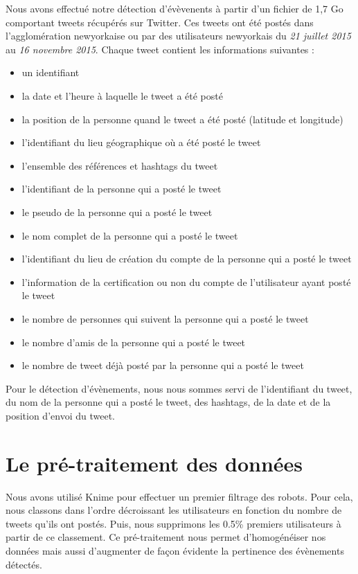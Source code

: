 \documentclass[12pt]{article}
\begin{document}
Nous avons effectu\'e notre d\'etection d'\'ev\`evenents \`a partir d'un fichier de 1,7 Go comportant  tweets  r\'ecup\'er\'es sur Twitter. Ces tweets ont \'et\'e post\'es dans l'agglom\'eration newyorkaise ou par des utilisateurs newyorkais du \textit{21 juillet 2015} au \textit{16 novembre 2015}. Chaque tweet contient les informations suivantes :

\begin{itemize}
	\item un identifiant
	\item la date et l'heure \`a laquelle le tweet a \'et\'e post\'e
	\item la position de la personne quand le tweet a \'et\'e post\'e (latitude et longitude)
	\item l'identifiant du lieu g\'eographique o\`u a \'et\'e post\'e le tweet
	\item l'ensemble des r\'ef\'erences et hashtags du tweet
	\item l'identifiant de la personne qui a post\'e le tweet
	\item le pseudo de la personne qui a post\'e le tweet
	\item le nom complet de la personne qui a post\'e le tweet
	\item l'identifiant du lieu de cr\'eation du compte de la personne qui a post\'e le tweet
	\item l'information de la certification ou non du compte de l'utilisateur ayant post\'e le tweet
	\item le nombre de personnes qui suivent la personne qui a post\'e le tweet
	\item le nombre d'amis de la personne qui a post\'e le tweet
	\item le nombre de tweet d\'ej\`a post\'e par la personne qui a post\'e le tweet
\end{itemize}

Pour le d\'etection d'\'ev\`enements, nous nous sommes servi de l'identifiant du tweet, du nom de la personne qui a post\'e le
tweet, des hashtags, de la date et de la position d'envoi du tweet.

\section{Le pr\'e-traitement des donn\'ees}

Nous avons utilis\'e Knime pour effectuer un premier filtrage des robots. Pour cela, nous classons dans l'ordre d\'ecroissant les utilisateurs en fonction du nombre de tweets qu'ils ont post\'es. Puis, nous supprimons les 0.5\% premiers utilisateurs \`{a} partir de ce classement. Ce pr\'e-traitement nous permet d'homog\'en\'eiser nos donn\'ees mais aussi d'augmenter de fa\c{c}on \'evidente la pertinence des \'ev\`enements d\'etect\'es. 
\end{document}
